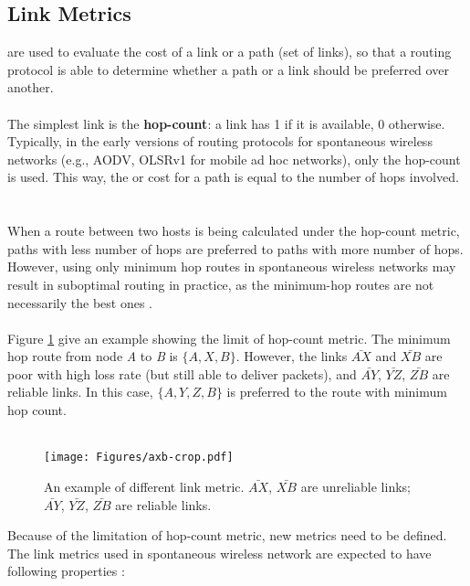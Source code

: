 \subsection{Link Metrics}
\label{ss:metrics}

 are used to evaluate the cost of a link or a path (set of links), so that a routing protocol is able to determine whether a path or a link should be preferred over another. \ \\ \ \\
%
The simplest link  is the {\bf hop-count}: a link has  1 if it is available, 0 otherwise. Typically, in the early versions of routing protocols for spontaneous wireless networks (e.g., AODV, OLSRv1 for mobile ad hoc networks), only the hop-count  is used. This way, the  or cost for a path is equal to the number of hops involved. \ \\ \ \\
%
When a route between two hosts is being calculated under the hop-count metric, paths with less number of hops are preferred to paths with more number of hops. However, using only minimum hop routes in spontaneous wireless networks may result in suboptimal routing in practice, as the minimum-hop routes are not necessarily the best ones \cite{couto03, wang95}. \ \\ \ \\
%
Figure \ref{f:metric} give an example showing the limit of hop-count metric. The minimum hop route from node \textit{A} to \textit{B} is $\{A,X,B\}$. However, the links $\bar{AX}$ and $\bar{XB}$ are poor with high loss rate (but still able to deliver packets), and $\bar{AY}$, $\bar{YZ}$, $\bar{ZB}$ are reliable links. In this case, $\{A,Y,Z,B\}$ is preferred to the route with minimum hop count. \ \\ \ \\
%
\begin{figure}
\centering
\texttt{[image: Figures/axb-crop.pdf]}
\caption{An example of different link metric. $\bar{AX}$, $\bar{XB}$ are unreliable links; $\bar{AY}$, $\bar{YZ}$, $\bar{ZB}$ are reliable links.}
\label{f:metric}
\end{figure}
%
Because of the limitation of hop-count metric, new metrics need to be defined. The link metrics used in spontaneous wireless network are expected to have following properties \cite{metrics}:

